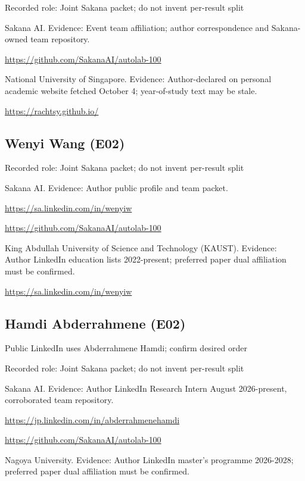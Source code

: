 \documentclass[11pt,a4paper]{article}
\begin{document}
Recorded role: Joint Sakana packet; do not invent per-result split

Sakana AI. Evidence: Event team affiliation; author correspondence and Sakana-owned team repository.

{\small \url{https://github.com/SakanaAI/autolab-100}\par}

National University of Singapore. Evidence: Author-declared on personal academic website fetched October 4; year-of-study text may be stale.

{\small \url{https://rachtsy.github.io/}\par}

\subsection{Wenyi Wang (E02)}
Recorded role: Joint Sakana packet; do not invent per-result split

Sakana AI. Evidence: Author public profile and team packet.

{\small \url{https://sa.linkedin.com/in/wenyiw}\par}

{\small \url{https://github.com/SakanaAI/autolab-100}\par}

King Abdullah University of Science and Technology (KAUST). Evidence: Author LinkedIn education lists 2022-present; preferred paper dual affiliation must be confirmed.

{\small \url{https://sa.linkedin.com/in/wenyiw}\par}

\subsection{Hamdi Abderrahmene (E02)}
Public LinkedIn uses Abderrahmene Hamdi; confirm desired order

Recorded role: Joint Sakana packet; do not invent per-result split

Sakana AI. Evidence: Author LinkedIn Research Intern August 2026-present, corroborated team repository.

{\small \url{https://jp.linkedin.com/in/abderrahmenehamdi}\par}

{\small \url{https://github.com/SakanaAI/autolab-100}\par}

Nagoya University. Evidence: Author LinkedIn master's programme 2026-2028; preferred paper dual affiliation must be confirmed.
\end{document}
